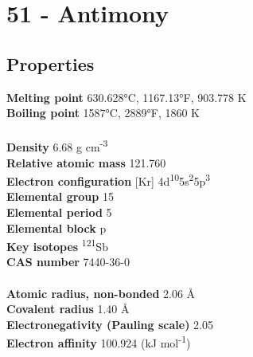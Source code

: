 \section{51 - Antimony}
\label{sec:elem-antimony}
\subsection{Properties}
\textbf{Melting point} 630.628°C, 1167.13°F, 903.778 K\\
\textbf{Boiling point} 1587°C, 2889°F, 1860 K\\
\\
\textbf{Density} 6.68 g cm\textsuperscript{-3}\\
\textbf{Relative atomic mass} 121.760\\
\textbf{Electron configuration} [Kr] 4d\textsuperscript{10}5s\textsuperscript{2}5p\textsuperscript{3}\\
\textbf{Elemental group} 15\\
\textbf{Elemental period} 5\\
\textbf{Elemental block} p\\
\textbf{Key isotopes} \textsuperscript{121}Sb\\
\textbf{CAS number} 7440-36-0\\
\\
\textbf{Atomic radius, non-bonded} 2.06 Å\\
\textbf{Covalent radius} 1.40 Å\\
\textbf{Electronegativity (Pauling scale)} 2.05\\
\textbf{Electron affinity} 100.924 (kJ mol\textsuperscript{-1})\\